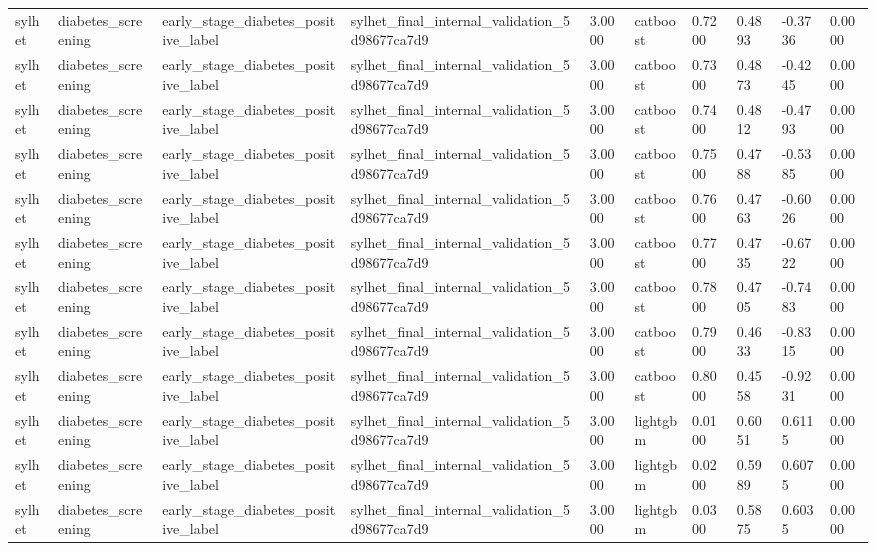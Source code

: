 \begin{tabular}{llllllllll}
sylhet & diabetes\_screening & early\_stage\_diabetes\_positive\_label & sylhet\_final\_internal\_validation\_5d98677ca7d9 & 3.0000 & catboost & 0.7200 & 0.4893 & -0.3736 & 0.0000 \\
sylhet & diabetes\_screening & early\_stage\_diabetes\_positive\_label & sylhet\_final\_internal\_validation\_5d98677ca7d9 & 3.0000 & catboost & 0.7300 & 0.4873 & -0.4245 & 0.0000 \\
sylhet & diabetes\_screening & early\_stage\_diabetes\_positive\_label & sylhet\_final\_internal\_validation\_5d98677ca7d9 & 3.0000 & catboost & 0.7400 & 0.4812 & -0.4793 & 0.0000 \\
sylhet & diabetes\_screening & early\_stage\_diabetes\_positive\_label & sylhet\_final\_internal\_validation\_5d98677ca7d9 & 3.0000 & catboost & 0.7500 & 0.4788 & -0.5385 & 0.0000 \\
sylhet & diabetes\_screening & early\_stage\_diabetes\_positive\_label & sylhet\_final\_internal\_validation\_5d98677ca7d9 & 3.0000 & catboost & 0.7600 & 0.4763 & -0.6026 & 0.0000 \\
sylhet & diabetes\_screening & early\_stage\_diabetes\_positive\_label & sylhet\_final\_internal\_validation\_5d98677ca7d9 & 3.0000 & catboost & 0.7700 & 0.4735 & -0.6722 & 0.0000 \\
sylhet & diabetes\_screening & early\_stage\_diabetes\_positive\_label & sylhet\_final\_internal\_validation\_5d98677ca7d9 & 3.0000 & catboost & 0.7800 & 0.4705 & -0.7483 & 0.0000 \\
sylhet & diabetes\_screening & early\_stage\_diabetes\_positive\_label & sylhet\_final\_internal\_validation\_5d98677ca7d9 & 3.0000 & catboost & 0.7900 & 0.4633 & -0.8315 & 0.0000 \\
sylhet & diabetes\_screening & early\_stage\_diabetes\_positive\_label & sylhet\_final\_internal\_validation\_5d98677ca7d9 & 3.0000 & catboost & 0.8000 & 0.4558 & -0.9231 & 0.0000 \\
sylhet & diabetes\_screening & early\_stage\_diabetes\_positive\_label & sylhet\_final\_internal\_validation\_5d98677ca7d9 & 3.0000 & lightgbm & 0.0100 & 0.6051 & 0.6115 & 0.0000 \\
sylhet & diabetes\_screening & early\_stage\_diabetes\_positive\_label & sylhet\_final\_internal\_validation\_5d98677ca7d9 & 3.0000 & lightgbm & 0.0200 & 0.5989 & 0.6075 & 0.0000 \\
sylhet & diabetes\_screening & early\_stage\_diabetes\_positive\_label & sylhet\_final\_internal\_validation\_5d98677ca7d9 & 3.0000 & lightgbm & 0.0300 & 0.5875 & 0.6035 & 0.0000 \\

\end{tabular}
